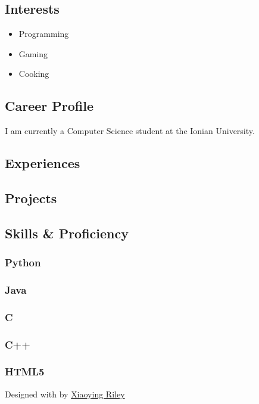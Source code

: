 \documentclass[english,]{article}
\providecommand{\tightlist}{%
  \setlength{\itemsep}{0pt}\setlength{\parskip}{0pt}}
\begin{document}
\hypertarget{interests}{%
\subsection{Interests}\label{interests}}

\begin{itemize}
\tightlist
\item
  Programming
\item
  Gaming
\item
  Cooking
\end{itemize}

\hypertarget{career-profile}{%
\subsection{\texorpdfstring{{ \emph{} \emph{} } Career
Profile}{    Career Profile}}\label{career-profile}}

I am currently a Computer Science student at the Ionian University.

\hypertarget{experiences}{%
\subsection{\texorpdfstring{{ \emph{} \emph{} }
Experiences}{    Experiences}}\label{experiences}}

\hypertarget{section-1}{%
\subsubsection{}\label{section-1}}

\hypertarget{projects}{%
\subsection{\texorpdfstring{{ \emph{} \emph{} }
Projects}{    Projects}}\label{projects}}

\hypertarget{skills-proficiency}{%
\subsection{\texorpdfstring{{ \emph{} \emph{} } Skills \&
Proficiency}{    Skills \& Proficiency}}\label{skills-proficiency}}

\hypertarget{python}{%
\subsubsection{Python}\label{python}}

\hypertarget{java}{%
\subsubsection{Java}\label{java}}

\hypertarget{c}{%
\subsubsection{C}\label{c}}

\hypertarget{c-1}{%
\subsubsection{C++}\label{c-1}}

\hypertarget{html5}{%
\subsubsection{HTML5}\label{html5}}

{Designed with \emph{} by \href{http://themes.3rdwavemedia.com}{Xiaoying
Riley}}
\end{document}
